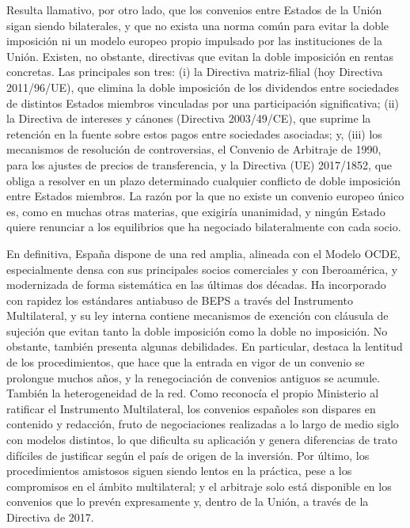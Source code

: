 \documentclass[10pt,a4paper]{article}
\begin{document}
Resulta llamativo, por otro lado, que los convenios entre Estados de la Unión sigan siendo bilaterales, y que no exista una norma común para evitar la doble imposición ni un modelo europeo propio impulsado por las instituciones de la Unión. Existen, no obstante, directivas que evitan la doble imposición en rentas concretas. Las principales son tres: (i) la Directiva matriz-filial (hoy Directiva 2011/96/UE), que elimina la doble imposición de los dividendos entre sociedades de distintos Estados miembros vinculadas por una participación significativa; (ii) la Directiva de intereses y cánones (Directiva 2003/49/CE), que suprime la retención en la fuente sobre estos pagos entre sociedades asociadas; y, (iii) los mecanismos de resolución de controversias, el Convenio de Arbitraje de 1990, para los ajustes de precios de transferencia, y la Directiva (UE) 2017/1852, que obliga a resolver en un plazo determinado cualquier conflicto de doble imposición entre Estados miembros. La razón por la que no existe un convenio europeo único es, como en muchas otras materias, que exigiría unanimidad, y ningún Estado quiere renunciar a los equilibrios que ha negociado bilateralmente con cada socio.

En definitiva, España dispone de una red amplia, alineada con el Modelo OCDE, especialmente densa con sus principales socios comerciales y con Iberoamérica, y modernizada de forma sistemática en las últimas dos décadas. Ha incorporado con rapidez los estándares antiabuso de BEPS a través del Instrumento Multilateral, y su ley interna contiene mecanismos de exención con cláusula de sujeción que evitan tanto la doble imposición como la doble no imposición. No obstante, también presenta algunas debilidades. En particular, destaca la lentitud de los procedimientos, que hace que la entrada en vigor de un convenio se prolongue muchos años, y la renegociación de convenios antiguos se acumule. También la heterogeneidad de la red. Como reconocía el propio Ministerio al ratificar el Instrumento Multilateral, los convenios españoles son dispares en contenido y redacción, fruto de negociaciones realizadas a lo largo de medio siglo con modelos distintos, lo que dificulta su aplicación y genera diferencias de trato difíciles de justificar según el país de origen de la inversión. Por último, los procedimientos amistosos siguen siendo lentos en la práctica, pese a los compromisos en el ámbito multilateral; y el arbitraje solo está disponible en los convenios que lo prevén expresamente y, dentro de la Unión, a través de la Directiva de 2017. 
\end{document}
